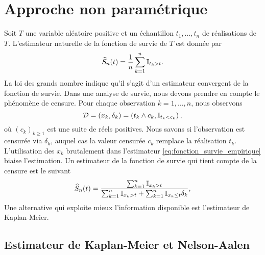 \chapter{Approche non paramétrique}\label{sec:nonparametric}
Soit $T$ une variable aléatoire positive et un échantillon $t_1,\ldots, t_n$ de réalisations \iid de $T$. L'estimateur naturelle de la fonction de survie de $T$ est donnée par 
\begin{equation}\label{eq:fonction_survie_empirique}
\widehat{S}_n(t) =\frac{1}{n}\sum_{k=1}^n\mathbb{I}_{t_k >t}.
\end{equation}
La loi des grands nombre indique qu'il s'agit d'un estimateur convergent de la fonction de survie. Dans une analyse de survie, nous devons prendre en compte le phénomène de censure. Pour chaque observation $k=1,\ldots, n$, nous observons 
$$
\mathcal{D} = (x_k, \delta_k) = \left(t_k\land c_k, \mathbb{I}_{t_k<c_k}\right),
$$
où $(c_k)_{k\geq1}$ est une suite de réels positives. Nous savons si l'observation est censurée via $\delta_k$, auquel cas la valeur censurée $c_k$ remplace la réalisation $t_k$. L'utilisation des $x_k$ brutalement dans l'estimateur \eqref{eq:fonction_survie_empirique} biaise l'estimation. Un estimateur de la fonction de survie qui tient compte de la censure est le suivant 
\begin{equation}\label{eq:fonction_survie_empirique_censure}
\widehat{S}_n(t) =\frac{\sum_{k=1}^n\mathbb{I}_{x_k >t}}{\sum_{k=1}^n\mathbb{I}_{x_k >t} + \sum_{k=1}^n\mathbb{I}_{x_k \leq t}\delta_k},
\end{equation}
Une alternative qui exploite mieux l'information disponible est l'estimateur de Kaplan-Meier.
\section{Estimateur de Kaplan-Meier et Nelson-Aalen}

